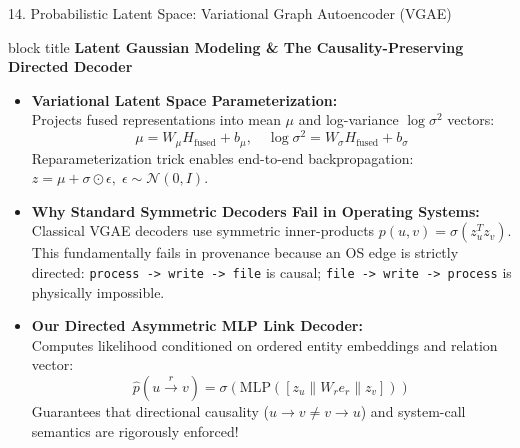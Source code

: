 \documentclass[aspectratio=169,10pt]{beamer}
\begin{document}
\begin{frame}[t]{14. Probabilistic Latent Space: Variational Graph Autoencoder (VGAE)}
\vspace{-0.2em}
\begin{beamercolorbox}[rounded=true,shadow=false,sep=0.30em,wd=\textwidth]{block title}
\textbf{\scriptsize Latent Gaussian Modeling \& The Causality-Preserving Directed Decoder}
\end{beamercolorbox}
\vspace{0.10em}
{\fontsize{7.0pt}{9.8pt}\selectfont
\begin{itemize}\itemsep0.18em
  \item \textbf{Variational Latent Space Parameterization:}\\
  Projects fused representations into mean $\mu$ and log-variance $\log \sigma^2$ vectors:
  \[
  \mu = W_\mu H_{\text{fused}} + b_\mu, \quad \log \sigma^2 = W_\sigma H_{\text{fused}} + b_\sigma
  \]
  Reparameterization trick enables end-to-end backpropagation: $z = \mu + \sigma \odot \epsilon, \; \epsilon \sim \mathcal{N}(0, I)$.
  \item \textbf{Why Standard Symmetric Decoders Fail in Operating Systems:}\\
  Classical VGAE decoders use symmetric inner-products $p(u, v) = \sigma(z_u^T z_v)$. This fundamentally fails in provenance because an OS edge is strictly directed: \texttt{process -> write -> file} is causal; \texttt{file -> write -> process} is physically impossible.
  \item \textbf{Our Directed Asymmetric MLP Link Decoder:}\\
  Computes likelihood conditioned on ordered entity embeddings and relation vector:
  \[
  \hat{p}(u \xrightarrow{r} v) = \sigma\left(\text{MLP}([z_u \parallel W_r e_r \parallel z_v])\right)
  \]
  Guarantees that directional causality ($u \to v \neq v \to u$) and system-call semantics are rigorously enforced!
\end{itemize}
}
\end{frame}
\end{document}

